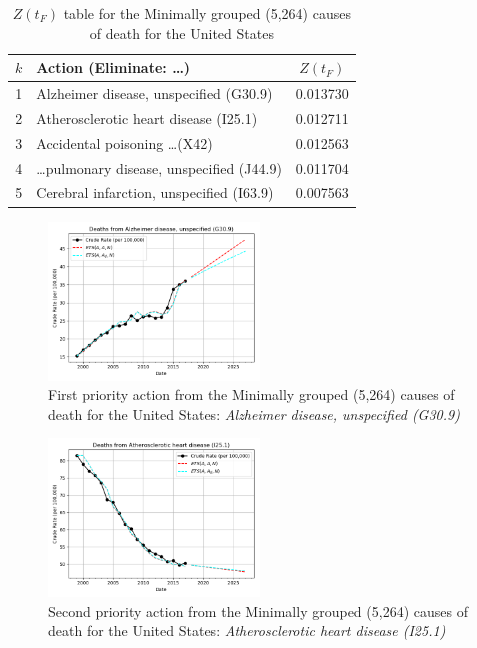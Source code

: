 \documentclass[10pt, a4paper, twocolumn]{IEEEconf}
\begin{document}
\begin{table}[H]
  \centering
  \begin{tabular}{clc}
    \toprule
      $k$ & Action (Eliminate: \ldots) & $Z(t_F)$ \\
    \midrule
      1 &                                Alzheimer disease, unspecified (G30.9) & 0.013730 \\
      2 &                                 Atherosclerotic heart disease (I25.1) & 0.012711 \\
      3 &                                     Accidental poisoning \ldots (X42) & 0.012563 \\
      4 &                         \ldots pulmonary disease, unspecified (J44.9) & 0.011704 \\
      5 &                              Cerebral infarction, unspecified (I63.9) & 0.007563 \\
    \bottomrule
  \end{tabular}
  \caption{$Z(t_F)$ table for the Minimally grouped (5,264) causes of death for the United States}
  \label{table:ztable7}
\end{table}

\begin{figure}[H]
  \centering
  \includegraphics[width=0.5\textwidth]{results/US_ICD10_MINIMALLY_GROUPED/Alzheimer_disease_unspecified_G30_9_ets.png}
  \caption{First priority action from the Minimally grouped (5,264) causes of death for the United States: \textit{Alzheimer disease, unspecified (G30.9)}}\label{fig:k7a}
\end{figure}

\begin{figure}[H]
  \centering
  \includegraphics[width=0.5\textwidth]{results/US_ICD10_MINIMALLY_GROUPED/Atherosclerotic_heart_disease_I25_1_ets.png}
  \caption{Second priority action from the Minimally grouped (5,264) causes of death for the United States: \textit{Atherosclerotic heart disease (I25.1)}}\label{fig:k7b}
\end{figure}
\end{document}
